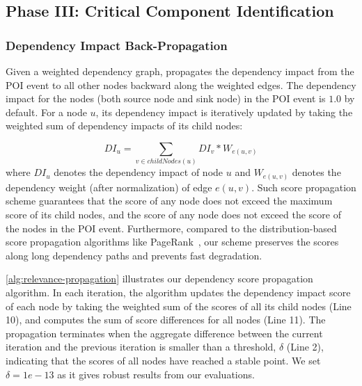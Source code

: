 \subsection{Phase III: Critical Component Identification}
\label{subsec:phase3}




\subsubsection{Dependency Impact Back-Propagation}
\label{subsubsec:propagation}

Given a weighted dependency graph, \tool propagates the dependency impact from the POI event to all other nodes backward along the weighted edges. 
The dependency impact for the nodes (both source node and sink node) in the POI event is $1.0$ by default.
%
For a node $u$, its dependency impact is iteratively updated by taking the weighted sum of dependency impacts of its child nodes: 

\begin{equation}
    \label{eq:reputation}
     DI_{u} =\sum_{v \in childNodes(u)} DI_{v}*W_{e(u,v)}
\end{equation}
where $ DI_{u}$ denotes the dependency impact of node $u$ and $W_{e(u,v)}$ denotes the dependency weight (after normalization) of edge $e(u,v)$.
%
Such score propagation scheme guarantees that the score of any node does not exceed the maximum score of its child nodes, and the score of any node does not exceed the score of the nodes in the POI event.
%
Furthermore, compared to the distribution-based score propagation algorithms like PageRank~\cite{pagerank}, our scheme preserves the scores along long dependency paths and prevents fast degradation.


\cref{alg:relevance-propagation} illustrates our dependency score propagation algorithm. 
In each iteration, the algorithm updates the dependency impact score of each node by taking the weighted sum of the scores of  all its child nodes (Line 10), and computes the sum of score differences for all nodes (Line 11).
The propagation terminates when the aggregate difference between the current iteration and the previous iteration is smaller than a threshold, $\delta$ (Line 2), indicating that the scores of all nodes have reached a stable point.
We set $\delta = 1e-13$ as it gives robust results from our evaluations.



